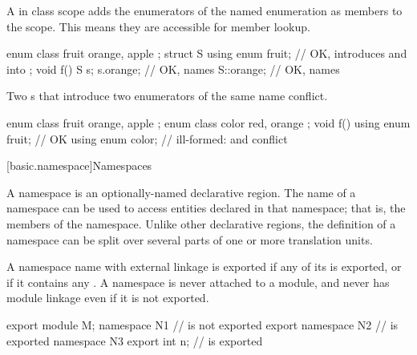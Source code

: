 \pnum
\begin{note}
A  in class scope
adds the enumerators of the named enumeration as members to the scope.
This means they are accessible for member lookup.
\begin{example}
\begin{codeblock}
enum class fruit { orange, apple };
struct S {
  using enum fruit;             // OK, introduces  and  into 
};
void f() {
  S s;
  s.orange;                     // OK, names 
  S::orange;                    // OK, names 
}
\end{codeblock}
\end{example}
\end{note}

\pnum
\begin{note}
Two s
that introduce two enumerators of the same name conflict.
\begin{example}
\begin{codeblock}
enum class fruit { orange, apple };
enum class color { red, orange };
void f() {
  using enum fruit;             // OK
  using enum color;             // ill-formed:  and  conflict
}
\end{codeblock}
\end{example}
\end{note}

[basic.namespace]{Namespaces}%

\pnum
A namespace is an optionally-named declarative region. The name of a
namespace can be used to access entities declared in that namespace;
that is, the members of the namespace. Unlike other declarative regions,
the definition of a namespace can be split over several parts of one or
more translation units.

\pnum
\begin{note}
A namespace name with external linkage is exported
if any of its  is exported,
or if it contains any
.
A namespace is never attached to a module,
and never has module linkage
even if it is not exported.
\end{note}
\begin{example}
\begin{codeblock}
export module M;
namespace N1 {}                 //  is not exported
export namespace N2 {}          //  is exported
namespace N3 { export int n; }  //  is exported
\end{codeblock}
\end{example}

